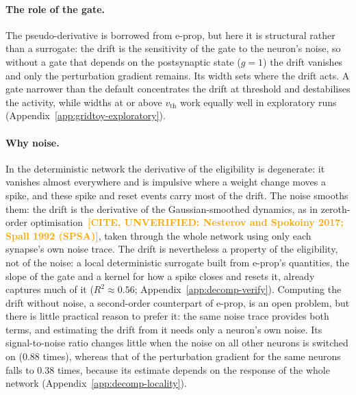 \documentclass[10pt,twocolumn]{article}
\newcommand{\unverified}[1]{\textcolor{orange}{\bfseries[CITE, UNVERIFIED: #1]}}
\begin{document}
\paragraph{The role of the gate.}
The pseudo-derivative is borrowed from e-prop, but here it is structural rather
than a surrogate: the drift is the sensitivity of the gate to the neuron's noise,
so without a gate that depends on the postsynaptic state ($g=1$) the drift
vanishes and only the perturbation gradient remains. Its width sets where the
drift acts. A gate narrower than the default concentrates the drift at threshold
and destabilises the activity, while widths at or above $v_{\mathrm{th}}$ work
equally well in exploratory runs (Appendix~\ref{app:gridtoy-exploratory}).

\paragraph{Why noise.}
In the deterministic network the derivative of the eligibility is degenerate: it
vanishes almost everywhere and is impulsive where a weight change moves a spike,
and these spike and reset events carry most of the drift. The noise smooths them:
the drift is the derivative of the Gaussian-smoothed dynamics, as in zeroth-order
optimisation~\unverified{Nesterov and Spokoiny 2017; Spall 1992 (SPSA)}, taken
through the whole network using only each synapse's own noise trace. The drift is nevertheless a property
of the eligibility, not of the noise: a local deterministic surrogate built from
e-prop's quantities, the slope of the gate and a kernel for how a spike closes and
resets it, already captures much of it ($R^2\approx0.56$;
Appendix~\ref{app:decomp-verify}). Computing the drift without noise, a second-order
counterpart of e-prop, is an open problem, but there is little practical reason to
prefer it: the same noise trace provides both terms, and estimating the drift from
it needs only a neuron's own noise. Its signal-to-noise ratio changes little when the
noise on all other neurons is switched on ($0.88$ times), whereas that of the
perturbation gradient for the same neurons falls to $0.38$ times, because its
estimate depends on the response of the whole network
(Appendix~\ref{app:decomp-locality}).
\end{document}
